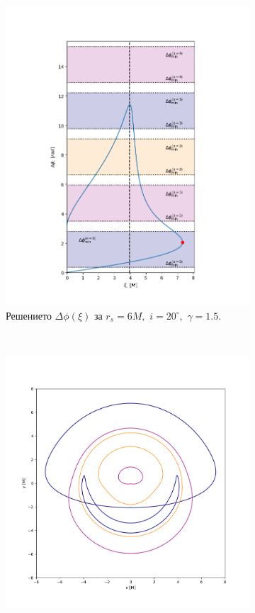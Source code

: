 \begin{figure}[!htb]
	\begin{subfigure}{6cm}
		
		\includegraphics[scale = 0.32]{GB_70_deg_r6_gamma_1.5_impact.png}
		\caption{Решението $\Delta\phi(\xi)$ за $r_s = 6M,\,\, i = 20^\circ,\,\,\gamma = 1.5$.} 
	\end{subfigure}\,\,\,
	\begin{subfigure}{6cm}
		\hspace{-0.8cm}
		\includegraphics[scale = 0.3]{GB_70_deg_r6_gamma_1.5.png}

\end{subfigure}
\end{figure}
